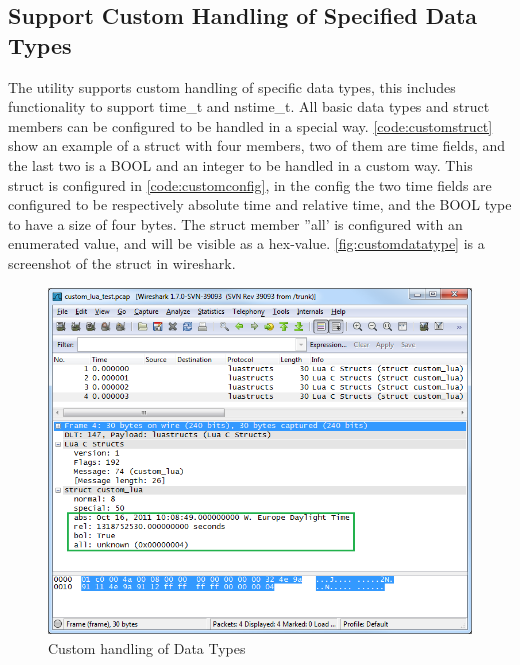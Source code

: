 \subsection{Support Custom Handling of Specified Data Types}
The \gls{utility} supports custom handling of specific data types, this includes 
functionality to support  time\_t and nstime\_t. All basic data types and 
\gls{struct} \glspl{member} can be configured to be handled in a special way. 
\autoref{code:customstruct} show an example of a \gls{struct} with four \glspl{member}, two 
of them are time fields, and the last two is a BOOL and an \gls{integer} to be 
handled in a custom way. This \gls{struct} is configured in 
\autoref{code:customconfig}, in the config the two time fields are configured 
to be respectively absolute time and relative time, and the BOOL type to have 
a size of four bytes. The \gls{struct} \gls{member} ''all' is configured with an enumerated 
value, and will be visible as a hex-value. \autoref{fig:customdatatype} is a 
screenshot of the \gls{struct} in \Gls{wireshark}.

\begin{figure}[ht]
	\center
	\includegraphics[width=\textwidth]{./sprints/img/wireshark_custom}
	\caption{Custom handling of Data Types\label{fig:customdatatype}}
\end{figure}



